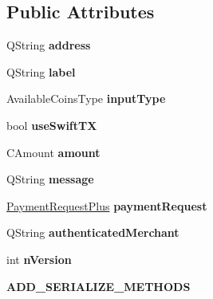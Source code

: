 \subsection*{Public Attributes}
\begin{DoxyCompactItemize}
\item 
\mbox{\label{class_send_coins_recipient_aaa8a3b13ff9f8e84baced2aec75307a0}} 
Q\+String {\bfseries address}
\item 
\mbox{\label{class_send_coins_recipient_a0152933f2c0cb9164d2fcb36bca83666}} 
Q\+String {\bfseries label}
\item 
\mbox{\label{class_send_coins_recipient_a92cb8e99cd0a80c5f972955338a8a0f5}} 
Available\+Coins\+Type {\bfseries input\+Type}
\item 
\mbox{\label{class_send_coins_recipient_a44630442765bed39f23b3aabbb872235}} 
bool {\bfseries use\+Swift\+TX}
\item 
\mbox{\label{class_send_coins_recipient_a54ab1355617a342b9b3d7f6e0781f578}} 
C\+Amount {\bfseries amount}
\item 
\mbox{\label{class_send_coins_recipient_a83b85ce208f69adc9347f700ac60dfa0}} 
Q\+String {\bfseries message}
\item 
\mbox{\label{class_send_coins_recipient_a2442955006b2c2e42c040028addee9cc}} 
\mbox{\hyperlink{class_payment_request_plus}{Payment\+Request\+Plus}} {\bfseries payment\+Request}
\item 
\mbox{\label{class_send_coins_recipient_aca66c4d0e89bf5b2d2a993bb48029222}} 
Q\+String {\bfseries authenticated\+Merchant}
\item 
\mbox{\label{class_send_coins_recipient_a2c8bb55c771dbcd34b420ef06f6a48f7}} 
int {\bfseries n\+Version}
\item 
\mbox{\label{class_send_coins_recipient_a259325fd7555473b29d2d7d71b9b6357}} 
{\bfseries A\+D\+D\+\_\+\+S\+E\+R\+I\+A\+L\+I\+Z\+E\+\_\+\+M\+E\+T\+H\+O\+DS}
\end{DoxyCompactItemize}

